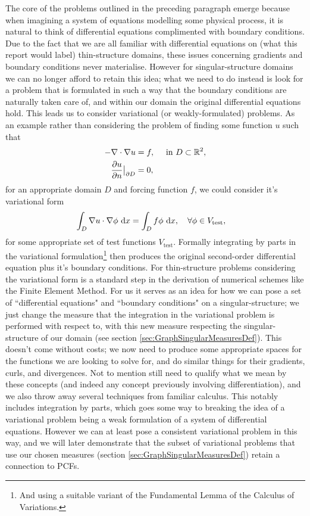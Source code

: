 The core of the problems outlined in the preceding paragraph emerge because when imagining a system of equations modelling some physical process, it is natural to think of differential equations complimented with boundary conditions.
Due to the fact that we are all familiar with differential equations on (what this report would label) thin-structure domains, these issues concerning gradients and boundary conditions never materialise.
However for singular-structure domains we can no longer afford to retain this idea; what we need to do instead is look for a problem that is formulated in such a way that the boundary conditions are naturally taken care of, and within our domain the original differential equations hold.
This leads us to consider variational (or weakly-formulated) problems.
As an example rather than considering the problem of finding some function $u$ such that 
\begin{align*}
	-\nabla\cdot\nabla u &= f, \quad\text{ in } D\subset\mathbb{R}^2, \\
	\dfrac{\partial u}{\partial n}\big\vert_{\partial D} &= 0,
\end{align*}
for an appropriate domain $D$ and forcing function $f$, we could consider it's variational form
\begin{align*}
	\int_{D}\nabla u \cdot \nabla \phi \ \mathrm{d}x &= \int_{D}f\phi \ \mathrm{d}x, \quad\forall \phi\in V_{\mathrm{test}},
\end{align*}
for some appropriate set of test functions $V_{\mathrm{test}}$.
Formally integrating by parts in the variational formulation\footnote{And using a suitable variant of the Fundamental Lemma of the Calculus of Variations.} then produces the original second-order differential equation plus it's boundary conditions.
For thin-structure problems considering the variational form is a standard step in the derivation of numerical schemes like the Finite Element Method.
For us it serves as an idea for how we can pose a set of ``differential equations" and ``boundary conditions" on a singular-structure; we just change the measure that the integration in the variational problem is performed with respect to, with this new measure respecting the singular-structure of our domain (see section \ref{sec:GraphSingularMeasuresDef}).
This doesn't come without costs; we now need to produce some appropriate spaces for the functions we are looking to solve for, and do similar things for their gradients, curls, and divergences.
Not to mention still need to qualify what we mean by these concepts (and indeed any concept previously involving differentiation), and we also throw away several techniques from familiar calculus.
This notably includes integration by parts, which goes some way to breaking the idea of a variational problem being a weak formulation of a system of differential equations.
However we can at least pose a consistent variational problem in this way, and we will later demonstrate that the subset of variational problems that use our chosen measures (section \ref{sec:GraphSingularMeasuresDef}) retain a connection to PCFs. \newline

